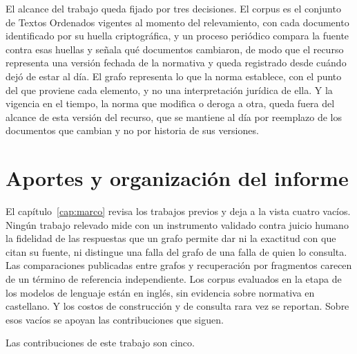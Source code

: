 \documentclass[12pt,a4paper]{report}
\begin{document}
El alcance del trabajo queda fijado por tres decisiones. El corpus es el conjunto de Textos Ordenados vigentes al momento del relevamiento, con cada documento identificado por su huella criptográfica, y un proceso periódico compara la fuente contra esas huellas y señala qué documentos cambiaron, de modo que el recurso representa una versión fechada de la normativa y queda registrado desde cuándo dejó de estar al día. El grafo representa lo que la norma establece, con el punto del que proviene cada elemento, y no una interpretación jurídica de ella. Y la vigencia en el tiempo, la norma que modifica o deroga a otra, queda fuera del alcance de esta versión del recurso, que se mantiene al día por reemplazo de los documentos que cambian y no por historia de sus versiones.

\section{Aportes y organización del informe}
\label{sec:contribuciones}

El capítulo~\ref{cap:marco} revisa los trabajos previos y deja a la vista cuatro vacíos. Ningún trabajo relevado mide con un instrumento validado contra juicio humano la fidelidad de las respuestas que un grafo permite dar ni la exactitud con que citan su fuente, ni distingue una falla del grafo de una falla de quien lo consulta. Las comparaciones publicadas entre grafos y recuperación por fragmentos carecen de un término de referencia independiente. Los corpus evaluados en la etapa de los modelos de lenguaje están en inglés, sin evidencia sobre normativa en castellano. Y los costos de construcción y de consulta rara vez se reportan. Sobre esos vacíos se apoyan las contribuciones que siguen.

Las contribuciones de este trabajo son cinco.
\end{document}
